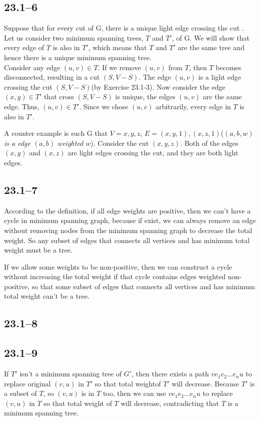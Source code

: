 \documentclass{article}
\begin{document}
\subsection*{23.1--6}
Suppose that for every cut of G, there is a unique light edge crossing the cut
. Let us consider two minimum spanning trees, $T$ and $T'$, of G. We will show
that every edge of $T$ is also in $T'$, which means that $T$ and $T'$ are the
same tree and hence there is a unique minimum spanning tree.\\
Consider any edge $(u, v)\in{T}$. If we remove $(u, v)$ from $T$, then $T$ becomes disconnected, resulting in a cut $(S, V-S)$. The edge $(u, v)$ is a light
edge crossing the cut $(S, V-S)$(by Exercise 23.1-3). Now consider the edge
$(x, y)\in{T'}$ that cross $(S, V-S)$ is unique, the edges $(u, v)$ are the
same edge. Thus, $(u, v)\in{T'}$. Since we chose $(u, v)$ arbitrarily, every
edge in $T$ is also in $T'$.

A counter example is such G that $V = {x, y, z}$, $E = {(x, y, 1), (x, z, 1)}$(\textit{$(a, b, w)$ is a edge $(a, b)$ weighted $w$}). Consider the cut
$({x}, {y, z})$. Both of the edges $(x, y)$ and $(x, z)$ are light edges
crossing the cut, and they are both light edges.

\subsection*{23.1--7}
According to the definition, if all edge weights are positive, then we can't
have a cycle in minimum spanning graph, because if exist, we can always remove
an edge without removing nodes from the minimum spanning graph to decrease the
total weight. So any subset of edges that connects all vertices and has
minimum total weight must be a tree.

If we allow some weights to be non-positive, then we can construct a cycle
without increasing the total weight if that cycle contains edges weighted
non-positive, so that some subset of edges that connects all vertices and has
minimum total weight can't be a tree.

\subsection*{23.1--8}


\subsection*{23.1--9}
If $T'$ isn't a minimum spanning tree of $G'$, then there exists a path
$ve_1e_2\ldots{}e_nu$ to replace original $(v, u)$ in $T'$ so that total weightof $T'$ will decrease. Because $T'$ is a subset of $T$, so $(v, u)$ is in $T$
too, then we can use $ve_1e_2\ldots{}e_nu$ to replace $(v, u)$ in $T$ so that
total weight of $T$ will decrease, contradicting that $T$ is a minimum
spanning tree.
\end{document}
